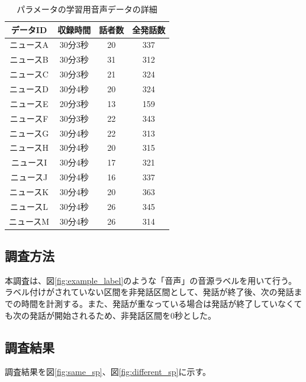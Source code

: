 \begin{table}[H]
  \begin{center}
  \label{table:train_detail}
    \caption{パラメータの学習用音声データの詳細}
    \begin{tabular}{|c||c|c|c|} \hline
      データID & 収録時間 & 話者数 & 全発話数 \\ \hline
      ニュースA & 30分3秒 & 20 & 337 \\ \hline
      ニュースB & 30分3秒 & 31 & 312\\ \hline
      ニュースC & 30分3秒 & 21 & 324 \\ \hline
      ニュースD & 30分4秒 & 20 & 324\\ \hline
      ニュースE & 20分3秒 & 13 & 159\\ \hline
      ニュースF & 30分3秒 & 22 & 343\\ \hline
      ニュースG & 30分4秒 & 22 & 313\\ \hline
      ニュースH & 30分4秒 & 20 & 315\\ \hline
      ニュースI & 30分4秒 & 17 & 321\\ \hline
      ニュースJ & 30分4秒 & 16 & 337\\ \hline
      ニュースK & 30分4秒 & 20 & 363\\ \hline
      ニュースL & 30分4秒 & 26 & 345\\ \hline
      ニュースM & 30分4秒 & 26 & 314\\ \hline
    \end{tabular}
  \end{center}
\end{table}

\subsection{調査方法}
本調査は、図\ref{fig:example_label}のような「音声」の音源ラベルを用いて行う。ラベル付けがされていない区間を非発話区間として、発話が終了後、次の発話までの時間を計測する。また、発話が重なっている場合は発話が終了していなくても次の発話が開始されるため、非発話区間を0秒とした。

\subsection{調査結果}
調査結果を図\ref{fig:same_sp}、図\ref{fig:different_sp}に示す。

